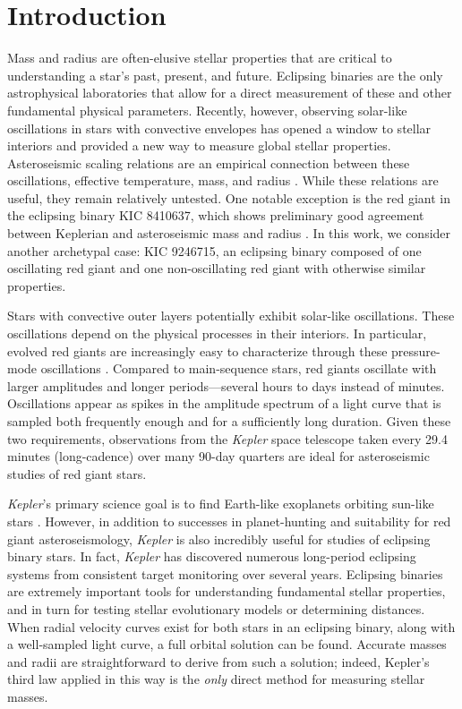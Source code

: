\section{Introduction}\label{intro}

Mass and radius are often-elusive stellar properties that are critical to understanding a star's past, present, and future. Eclipsing binaries are the only astrophysical laboratories that allow for a direct measurement of these and other fundamental physical parameters. Recently, however, observing solar-like oscillations in stars with convective envelopes has opened a window to stellar interiors and provided a new way to measure global stellar properties. Asteroseismic scaling relations are an empirical connection between these oscillations, effective temperature, mass, and radius \citep{kje95,hub10,mos13}. While these relations are useful, they remain relatively untested. One notable exception is the red giant in the eclipsing binary KIC 8410637, which shows preliminary good agreement between Keplerian and asteroseismic mass and radius \citep{fra13}. In this work, we consider another archetypal case: KIC 9246715, an eclipsing binary composed of one oscillating red giant and one non-oscillating red giant with otherwise similar properties.

Stars with convective outer layers potentially exhibit solar-like oscillations. These oscillations depend on the physical processes in their interiors. In particular, evolved red giants are increasingly easy to characterize through these pressure-mode oscillations \citep[for a review of this topic, see][]{cha13}. Compared to main-sequence stars, red giants oscillate with larger amplitudes and longer periods---several hours to days instead of minutes. Oscillations appear as spikes in the amplitude spectrum of a light curve that is sampled both frequently enough and for a sufficiently long duration. Given these two requirements, observations from the \emph{Kepler} space telescope taken every 29.4 minutes (long-cadence) over many 90-day quarters are ideal for asteroseismic studies of red giant stars.

\emph{Kepler}'s primary science goal is to find Earth-like exoplanets orbiting sun-like stars \citep{bor10}. However, in addition to successes in planet-hunting and suitability for red giant asteroseismology, \emph{Kepler} is also incredibly useful for studies of eclipsing binary stars. In fact, \emph{Kepler} has discovered numerous long-period eclipsing systems from consistent target monitoring over several years. Eclipsing binaries are extremely important tools for understanding fundamental stellar properties, and in turn for testing stellar evolutionary models or determining distances. When radial velocity curves exist for both stars in an eclipsing binary, along with a well-sampled light curve, a full orbital solution can be found. Accurate masses and radii are straightforward to derive from such a solution; indeed, Kepler's third law applied in this way is the \emph{only} direct method for measuring stellar masses.

